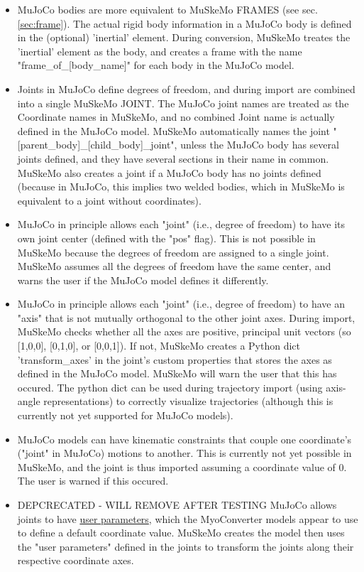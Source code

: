 \documentclass{article}
\begin{document}
\begin{itemize}
\item MuJoCo bodies are more equivalent to MuSkeMo FRAMES (see sec. \ref{sec:frame}). The actual rigid body information in a MuJoCo body is defined in the (optional) 'inertial' element. During conversion, MuSkeMo treates the 'inertial' element as the body, and creates a frame with the name "frame\_of\_[body\_name]" for each body in the MuJoCo model.
\item Joints in MuJoCo define degrees of freedom, and during import are combined into a single MuSkeMo JOINT. The MuJoCo joint names are treated as the Coordinate names in MuSkeMo, and no combined Joint name is actually defined in the MuJoCo model. MuSkeMo automatically names the joint "[parent\_body]\_[child\_body]\_joint", unless the MuJoCo body has several joints defined, and they have several sections in their name in common. MuSkeMo also creates a joint if a MuJoCo body has no joints defined (because in MuJoCo, this implies two welded bodies, which in MuSkeMo is equivalent to a joint without coordinates). 
\item MuJoCo in principle allows each "joint"  (i.e., degree of freedom) to have its own joint center (defined with the "pos" flag). This is not possible in MuSkeMo because the degrees of freedom are assigned to a single joint. MuSkeMo assumes all the degrees of freedom have the same center, and warns the user if the MuJoCo model defines it differently.
\item MuJoCo in principle allows each "joint" (i.e., degree of freedom) to have an "axis" that is not mutually orthogonal to the other joint axes. During import, MuSkeMo checks whether all the axes are positive, principal unit vectors (so [1,0,0], [0,1,0], or [0,0,1]). If not, MuSkeMo creates a Python dict 'transform\_axes' in the joint's custom properties that stores the axes as defined in the MuJoCo model. MuSkeMo will warn the user that this has occured. The python dict can be used during trajectory import (using axis-angle representations) to correctly visualize trajectories (although this is currently not yet supported for MuJoCo models).
\item MuJoCo models can have kinematic constraints that couple one coordinate's ("joint" in MuJoCo) motions to another. This is currently not yet possible in MuSkeMo, and the joint is thus imported assuming a coordinate value of 0. The user is warned if this occured.
\item DEPCRECATED - WILL REMOVE AFTER TESTING MuJoCo allows joints to have \href{https://mujoco.readthedocs.io/en/stable/modeling.html#cuser}{user parameters}, which the MyoConverter models appear to use to define a default coordinate value. MuSkeMo creates the model then uses the "user parameters" defined in the joints to transform the joints along their respective coordinate axes.

\end{itemize}
\end{document}
